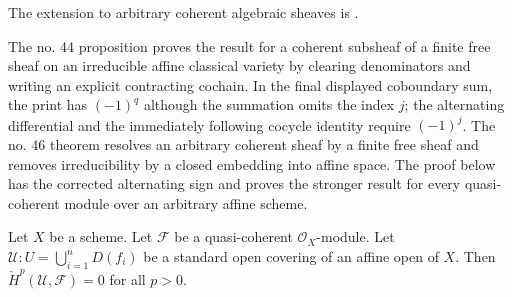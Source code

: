 \begin{lemma}
\label{lemma-cech-cohomology-quasi-coherent-trivial}
\begin{reference}
\cite[Chapter II, \S 3, no. 44, Proposition 7, pp. 236--237]{FAC}
The extension to arbitrary coherent algebraic sheaves is
\cite[Chapter II, \S 3, no. 46, Theorem 3, pp. 238--239]{FAC}.
\end{reference}
\begin{history}
The no. 44 proposition proves the result for a coherent subsheaf of a finite
free sheaf on an irreducible affine classical variety by clearing denominators
and writing an explicit contracting cochain. In the final displayed
coboundary sum, the print has $(-1)^q$ although the summation omits the index
$j$; the alternating differential and the immediately following cocycle
identity require $(-1)^j$. The no. 46 theorem resolves an arbitrary coherent
sheaf by a finite free sheaf and removes irreducibility by a closed embedding
into affine space. The proof below has the corrected alternating sign and
proves the stronger result for every quasi-coherent module over an arbitrary
affine scheme.
\end{history}
Let $X$ be a scheme.
Let $\mathcal{F}$ be a quasi-coherent $\mathcal{O}_X$-module.
Let $\mathcal{U} : U = \bigcup_{i = 1}^n D(f_i)$ be a standard
open covering of an affine open of $X$.
Then $\check{H}^p(\mathcal{U}, \mathcal{F}) = 0$ for
all $p > 0$.
\end{lemma}

